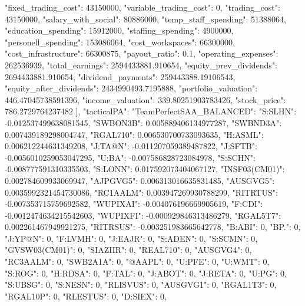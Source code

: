 {{            "fixed_trading_cost": 43150000,
            "variable_trading_cost": 0,
            "trading_cost": 43150000,
            "salary_with_social": 80886000,
            "temp_staff_spending": 51388064,
            "education_spending": 15912000,
            "staffing_spending": 4900000,
            "personell_spending": 153086064,
            "cost_workspaces": 66300000,
            "cost_infrastructure": 66300875,
            "payout_ratio": 0.1,
            "operating_expenses": 262536939,
            "total_earnings": 2594433881.910654,
            "equity_prev_dividends": 2694433881.910654,
            "dividend_payments": 259443388.19106543,
            "equity_after_dividends": 2434990493.7195888,
            "portfolio_valuation": 446.47045738591396,
            "income_valuation": 339.80251903783426,
            "stock_price": 786.2729764237482
        }
    ],
    "tacticalPA": {
        "TeamPerfectSAA_BALANCED": {
            "S:SLHN": -0.012537499638081545,
            "SWBON3B": 0.005889406134977287,
            "SWBND3A": 0.007439189298004747,
            "RGAL710": 0.006530700733093635,
            "H:ASML": 0.006212244631349208,
            "J:TA@N": -0.011207059389487822,
            "J:SFTB": -0.0056010259053047295,
            "U:BA": -0.007586828723084978,
            "S:SCHN": -0.008777591310335503,
            "S:LONN": 0.017592073404067127,
            "INSF03(CM01)": 0.002784609933069947,
            "AJPGVG5": 0.006313016635831485,
            "AUSGVG5": 0.0035992321454730086,
            "RC1AALM": 0.003947269930788299,
            "RITRTUS": -0.007353715759692582,
            "WUPIXAI": -0.004076196669905619,
            "F:CDI": -0.0012474634215542603,
            "WUPIXFI": -0.000929846313486279,
            "RGAL5T7": 0.002261467949921275,
            "RITRSUS": -0.003251983665642778,
            "B:ABI": 0,
            "BP.": 0,
            "J:YP@N": 0,
            "F:LVMH": 0,
            "J:EAJR": 0,
            "S:ADEN": 0,
            "S:SCMN": 0,
            "GVSW03(CM01)": 0,
            "SIAZIIR": 0,
            "REAL710": 0,
            "AUSGVG4": 0,
            "RC3AALM": 0,
            "SWB2A1A": 0,
            "@AAPL": 0,
            "U:PFE": 0,
            "U:WMT": 0,
            "S:ROG": 0,
            "H:RDSA": 0,
            "F:TAL": 0,
            "J:ABOT": 0,
            "J:RETA": 0,
            "U:PG": 0,
            "S:UBSG": 0,
            "S:NESN": 0,
            "RLISVUS": 0,
            "AUSGVG1": 0,
            "RGAL1T3": 0,
            "RGAL10P": 0,
            "RLESTUS": 0,
            "D:SIEX": 0,
}}}
